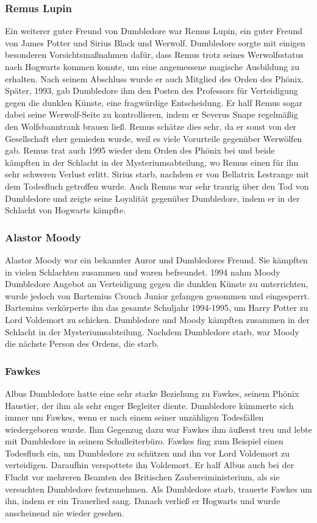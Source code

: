\documentclass[a4paper, 10pt]{article}
\begin{document}
\subsubsection*{\large Remus Lupin}
Ein weiterer guter Freund von Dumbledore war Remus Lupin, ein guter Freund von James Potter und Sirius Black und Werwolf. Dumbledore sorgte mit einigen besonderen Vorsichtsmaßnahmen dafür, dass Remus trotz seines Werwolfsstatus nach Hogwarts kommen konnte, um eine angemessene magische Ausbildung zu erhalten. Nach seinem Abschluss wurde er auch Mitglied des Orden des Phönix. Später, 1993, gab Dumbledore ihm den Posten des Professors für Verteidigung gegen die dunklen Künste, eine fragwürdige Entscheidung. Er half Remus sogar dabei seine Werwolf-Seite zu kontrollieren, indem er Severus Snape regelmäßig den Wolfsbanntrank brauen ließ. Remus schätze dies sehr, da er sonst von der Gesellschaft eher gemieden wurde, weil es viele Vorurteile gegenüber Werwölfen gab. Remus trat auch 1995 wieder dem Orden des Phönix bei und beide kämpften in der Schlacht in der Mysteriumsabteilung, wo Remus einen für ihn sehr schweren Verlust erlitt. Sirius starb, nachdem er von Bellatrix Lestrange mit dem Todesfluch getroffen wurde. Auch Remus war sehr traurig über den Tod von Dumbledore
und zeigte seine Loyalität gegenüber Dumbledore, indem er in der Schlacht von Hogwarts kämpfte.
\subsubsection*{\large Alastor Moody}
Alastor Moody war ein bekannter Auror und Dumbledores Freund. Sie kämpften in vielen Schlachten zusammen und waren befreundet. 1994 nahm Moody Dumbledore Angebot an Verteidigung gegen die dunklen Künste zu unterrichten, wurde jedoch von Bartemius Crouch Junior gefangen genommen und eingesperrt. Bartemius verkörperte ihn das gesamte Schuljahr 1994-1995, um Harry Potter zu Lord Voldemort zu schicken.
\vspace{10pt}
\newline
{}  
Dumbledore und Moody kämpften zusammen in der Schlacht in der Mysteriumsabteilung. Nachdem Dumbledore starb, war Moody die nächste Person des Ordens, die starb.
\subsubsection*{\large Fawkes}
Albus Dumbledore hatte eine sehr starke Beziehung zu Fawkes, seinem Phönix Haustier, der ihm als sehr enger Begleiter diente. Dumbledore kümmerte sich immer um Fawkes, wenn er nach einem seiner unzähligen Todesfällen wiedergeboren wurde. Ihm Gegenzug dazu war Fawkes ihm äußerst treu und lebte mit Dumbledore in seinem Schulleiterbüro. Fawkes fing zum Beispiel einen Todesfluch ein, um Dumbledore zu schützen und ihn vor Lord Voldemort zu verteidigen. Daraufhin verspottete ihn Voldemort. Er half Albus auch bei der Flucht vor mehreren Beamten des Britischen Zaubereiministerium, als sie versuchten Dumbledore festzunehmen. Als Dumbledore starb, trauerte Fawkes um ihn, indem er ein Trauerlied sang. Danach verließ er Hogwarts und wurde anscheinend nie wieder gesehen.
\end{document}
